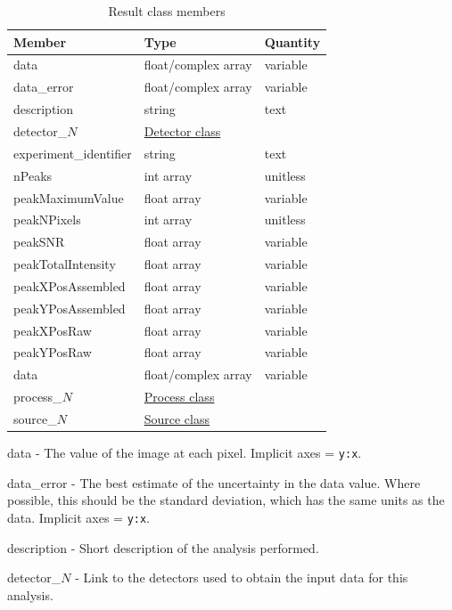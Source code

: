 \documentclass[usletter,11pt]{article}
\newcommand{\member}[2]
{ \noindent
{ \color{softBlue}  #1 - } #2
\vspace{0.2cm}
}
\begin{document}
\begin{table}[h!]\sffamily \footnotesize
\caption{Result class members}

\begin{tabular}{p{4.5cm} p{4.5cm}  p{2.5cm} }

\toprule
\bfseries Member     & \bfseries Type & \bfseries Quantity \\
\midrule
data &  float/complex array & variable \\
data\_error & float/complex array & variable \\
description & string & text \\
detector\_$N$ &  \hyperref[table:detector]{Detector class} & \\
experiment\_identifier & string  & text \\
nPeaks & int array & unitless \\
peakMaximumValue & float array & variable \\
peakNPixels & int array & unitless \\
peakSNR & float array & variable \\
peakTotalIntensity & float array & variable \\
peakXPosAssembled & float array & variable \\
peakYPosAssembled & float array & variable \\
peakXPosRaw & float array & variable \\
peakYPosRaw & float array & variable \\
data &  float/complex array & variable \\
process\_$N$ &  \hyperref[table:process]{Process class} & \\
source\_$N$ &  \hyperref[table:source]{Source class} & \\
\bottomrule
\end{tabular}
\end{table}

\member{data}{The value of the image at each pixel. Implicit axes = {\tt y:x}.}

\member{data\_error}{The best estimate of the uncertainty in the data
 value. Where possible, this should be the standard deviation, which
 has the same units as the data. Implicit axes = {\tt y:x}.}

\member{description}{Short description of the analysis performed.}

\member{detector\_$N$}{Link to the detectors used to obtain the input data for this
analysis.}
\end{document}

